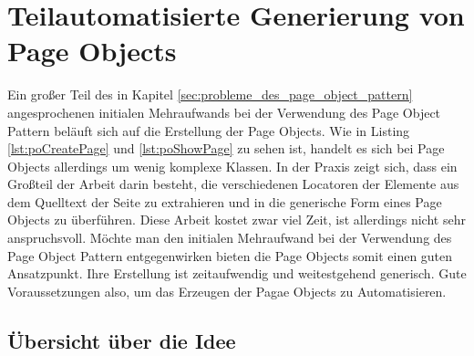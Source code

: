 
\chapter{Teilautomatisierte Generierung von Page Objects}
\label{sec:teilautomatisierte_generierung_von_pageObjects}

Ein großer Teil des in Kapitel \ref{sec:probleme_des_page_object_pattern} angesprochenen initialen Mehraufwands bei der Verwendung des Page Object Pattern beläuft sich auf die Erstellung der Page Objects.
Wie in Listing \ref{lst:poCreatePage} und \ref{lst:poShowPage} zu sehen ist, handelt es sich bei Page Objects allerdings um wenig komplexe Klassen. In der Praxis zeigt sich, dass ein Großteil der Arbeit darin besteht, die verschiedenen Locatoren der Elemente aus dem Quelltext der Seite zu extrahieren und in die generische Form eines Page Objects zu überführen.
Diese Arbeit kostet zwar viel Zeit, ist allerdings nicht sehr anspruchsvoll.
Möchte man den initialen Mehraufwand bei der Verwendung des Page Object Pattern entgegenwirken bieten die Page Objects somit einen guten Ansatzpunkt.
Ihre Erstellung ist zeitaufwendig und weitestgehend generisch. Gute Voraussetzungen also, um das Erzeugen der Pagae Objects zu Automatisieren.
\section{Übersicht über die Idee}
\label{sec:uebersicht_ueber_idee}


